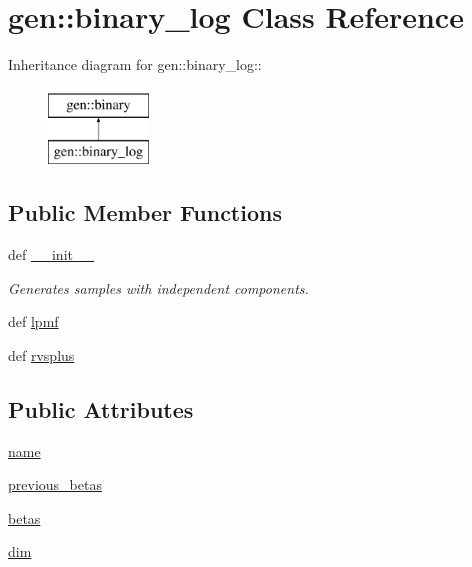 \hypertarget{classgen_1_1binary__log}{
\section{gen::binary\_\-log Class Reference}
\label{classgen_1_1binary__log}
}
Inheritance diagram for gen::binary\_\-log::\begin{figure}[H]
\begin{center}
\leavevmode
\includegraphics[height=2cm]{classgen_1_1binary__log}
\end{center}
\end{figure}
\subsection*{Public Member Functions}
\begin{CompactItemize}
\item 
def \hyperlink{classgen_1_1binary__log_46e453f2e09cc74cba4d43a8622db45f}{\_\-\_\-init\_\-\_\-}
\begin{CompactList}\small\item\em Generates samples with independent components. \item\end{CompactList}\item 
def \hyperlink{classgen_1_1binary__log_aa047299f937b4c89ae2e1fa6b9e2eac}{lpmf}
\item 
def \hyperlink{classgen_1_1binary__log_653557415fb49db33e342720fc024c21}{rvsplus}
\end{CompactItemize}
\subsection*{Public Attributes}
\begin{CompactItemize}
\item 
\hyperlink{classgen_1_1binary__log_7f23be8ef89c091c5b190ff55102090b}{name}
\item 
\hyperlink{classgen_1_1binary__log_8aec88c517667925c5e828359c2841ea}{previous\_\-betas}
\item 
\hyperlink{classgen_1_1binary__log_64b56a1380bd7d5058d2c2dbc346e4a8}{betas}
\item 
\hyperlink{classgen_1_1binary__log_2dc27524a2ecb8d70ae05dd5810aebcf}{dim}
\end{CompactItemize}
